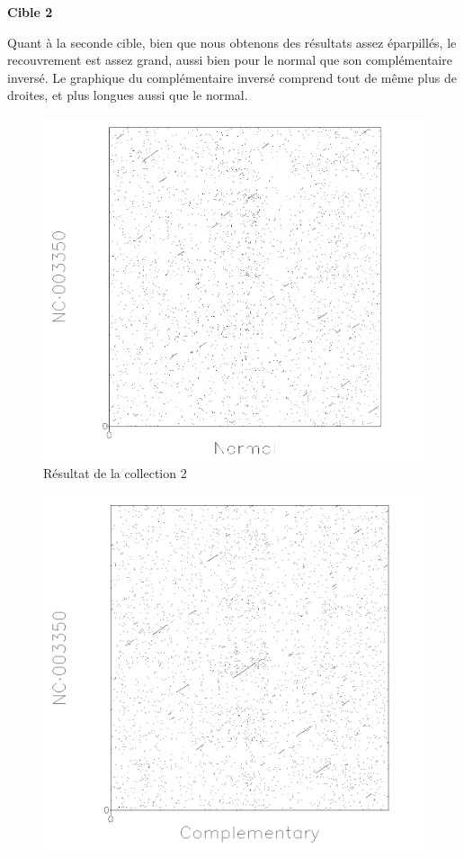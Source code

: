 \FloatBarrier

\noindent\textbf{Cible 2}

Quant à la seconde cible, bien que nous obtenons des résultats assez éparpillés,
le recouvrement est assez grand, aussi bien pour le normal que son
complémentaire inversé.
Le graphique du complémentaire inversé comprend tout de même plus de droites, et
plus longues aussi que le normal.

\begin{figure}[!ht]
	\begin{minipage}[r]{.46\linewidth}
		\begin{center}
		\includegraphics[scale= 0.4]{../res/cible2.png}
		Résultat de la collection 2
	\end{center}
\end{minipage} \hfill
\begin{minipage}[c]{.46 \linewidth}
	\begin{center}
			\includegraphics[scale= 0.4]{../res/cible2-ic.png}

\end{center}
\end{minipage}
\end{figure}
